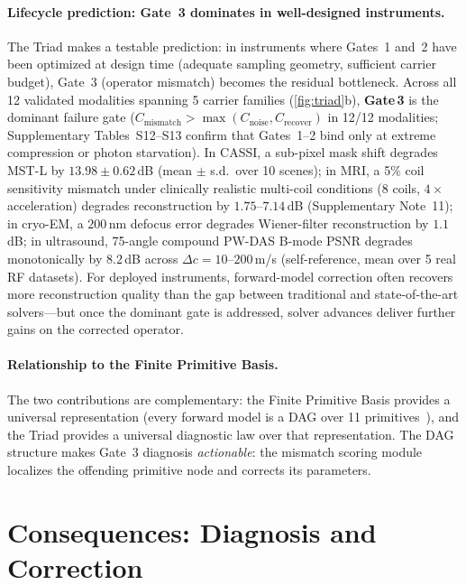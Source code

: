 \documentclass[11pt]{article}
\newcommand{\gatethree}{\textbf{Gate\,3}}
\begin{document}
\paragraph{Lifecycle prediction: Gate~3 dominates in well-designed instruments.}
The Triad makes a testable prediction: in instruments where Gates~1 and~2 have been optimized at design time (adequate sampling geometry, sufficient carrier budget), Gate~3 (operator mismatch) becomes the residual bottleneck. Across all 12 validated modalities spanning 5 carrier families (\cref{fig:triad}b), \gatethree{} is the dominant failure gate ($C_{\mathrm{mismatch}} > \max(C_{\mathrm{noise}}, C_{\mathrm{recover}})$ in 12/12 modalities; Supplementary Tables~S12--S13 confirm that Gates~1--2 bind only at extreme compression or photon starvation). In CASSI, a sub-pixel mask shift degrades MST-L by $13.98 \pm 0.62$\,dB (mean $\pm$ s.d.\ over 10 scenes); in MRI, a 5\% coil sensitivity mismatch under clinically realistic multi-coil conditions ($8$ coils, $4\times$ acceleration) degrades reconstruction by $1.75$--$7.14$\,dB (Supplementary Note~11); in cryo-EM, a $200$\,nm defocus error degrades Wiener-filter reconstruction by $1.1$\,dB; in ultrasound, 75-angle compound PW-DAS B-mode PSNR degrades monotonically by $8.2$\,dB across $\Delta c = 10$--$200$\,m/s (self-reference, mean over 5 real RF datasets). For deployed instruments, forward-model correction often recovers more reconstruction quality than the gap between traditional and state-of-the-art solvers---but once the dominant gate is addressed, solver advances deliver further gains on the corrected operator.

\paragraph{Relationship to the Finite Primitive Basis.}
The two contributions are complementary: the Finite Primitive Basis provides a universal representation (every forward model is a DAG over 11 primitives~\cite{yang2026fpt}), and the Triad provides a universal diagnostic law over that representation. The DAG structure makes Gate~3 diagnosis \emph{actionable}: the mismatch scoring module localizes the offending primitive node and corrects its parameters.



\FloatBarrier
\section*{Consequences: Diagnosis and Correction}
\end{document}
